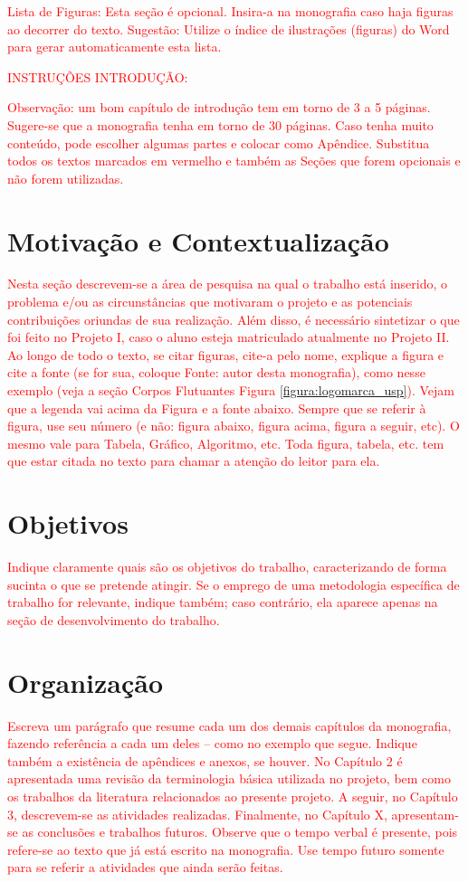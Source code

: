 \textcolor{red}{Lista de Figuras: Esta seção é opcional. Insira-a na monografia caso haja figuras ao decorrer do texto.
Sugestão: Utilize o índice de ilustrações (figuras) do Word para gerar automaticamente esta lista.}

\textcolor{red}{INSTRUÇÕES INTRODUÇÃO:}

\textcolor{red}{Observação: um bom capítulo de introdução tem em torno de 3 a 5 páginas. Sugere-se que a monografia tenha em torno de 30 páginas. Caso tenha muito conteúdo, pode escolher algumas partes e colocar como Apêndice. Substitua todos os textos marcados em vermelho e também as Seções que forem opcionais e não forem utilizadas.}

\section{Motivação e Contextualização}

\textcolor{red}{Nesta seção descrevem-se a área de pesquisa na qual o trabalho está inserido, o problema e/ou as circunstâncias que motivaram o projeto e as potenciais contribuições oriundas de sua realização. Além disso, é necessário sintetizar o que foi feito no Projeto I, caso o aluno esteja matriculado atualmente no Projeto II. Ao longo de todo o texto, se citar figuras, cite-a pelo nome, explique a figura e cite a fonte (se for sua, coloque Fonte: autor desta monografia), como nesse exemplo (veja a seção Corpos Flutuantes Figura \ref{figura:logomarca_usp}). Vejam que a legenda vai acima da Figura e a fonte abaixo. Sempre que se referir à figura, use seu número (e não: figura abaixo, figura acima, figura a seguir, etc). O mesmo vale para Tabela, Gráfico, Algoritmo, etc. Toda figura, tabela, etc. tem que estar citada no texto para chamar a atenção do leitor para ela.}

\section{Objetivos}

\textcolor{red}{Indique claramente quais são os objetivos do trabalho, caracterizando de forma sucinta o que se pretende atingir. Se o emprego de uma metodologia específica de trabalho for relevante, indique também; caso contrário, ela aparece apenas na seção de desenvolvimento do trabalho.}

\section{Organização}

\textcolor{red}{Escreva um parágrafo que resume cada um dos demais capítulos da monografia, fazendo referência a cada um deles – como no exemplo que segue. Indique também a existência de apêndices e anexos, se houver.  No Capítulo 2 é apresentada uma revisão da terminologia básica utilizada no projeto, bem como os trabalhos da literatura relacionados ao presente projeto. A seguir, no Capítulo 3, descrevem-se as atividades realizadas. Finalmente, no Capítulo X, apresentam-se as conclusões e trabalhos futuros. Observe que o tempo verbal é presente, pois refere-se ao texto que já está escrito na monografia. Use tempo futuro somente para se referir a atividades que ainda serão feitas.}
